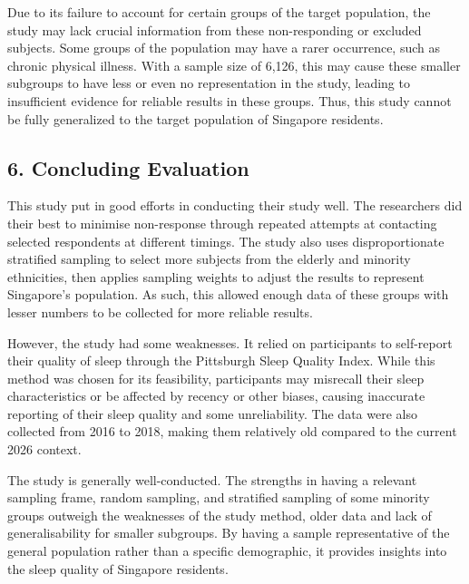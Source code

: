 Due to its failure to account for certain groups of the target population, the study may lack crucial information from these non-responding or excluded subjects. Some groups of the population may have a rarer occurrence, such as chronic physical illness. With a sample size of 6,126, this may cause these smaller subgroups to have less or even no representation in the study, leading to insufficient evidence for reliable results in these groups. Thus, this study cannot be fully generalized to the target population of Singapore residents.

\subsection*{6. Concluding Evaluation}

This study put in good efforts in conducting their study well. The researchers did their best to minimise non-response through repeated attempts at contacting selected respondents at different timings. The study also uses disproportionate stratified sampling to select more subjects from the elderly and minority ethnicities, then applies sampling weights to adjust the results to represent Singapore's population. As such, this allowed enough data of these groups with lesser numbers to be collected for more reliable results.

However, the study had some weaknesses. It relied on participants to self-report their quality of sleep through the Pittsburgh Sleep Quality Index. While this method was chosen for its feasibility, participants may misrecall their sleep characteristics or be affected by recency or other biases, causing inaccurate reporting of their sleep quality and some unreliability. The data were also collected from 2016 to 2018, making them relatively old compared to the current 2026 context.

The study is generally well-conducted. The strengths in having a relevant sampling frame, random sampling, and stratified sampling of some minority groups outweigh the weaknesses of the study method, older data and lack of generalisability for smaller subgroups. By having a sample representative of the general population rather than a specific demographic, it provides insights into the sleep quality of Singapore residents.